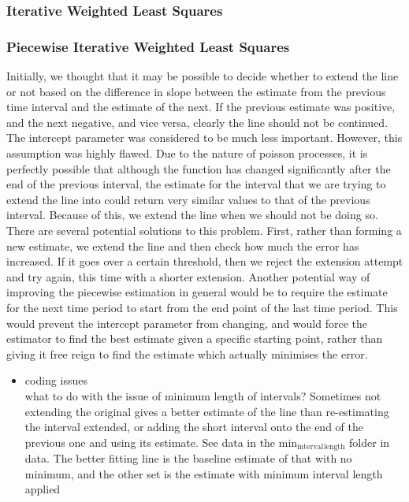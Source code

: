 \documentclass[a4paper,12pt]{article}
\begin{document}
\subsubsection{Iterative Weighted Least Squares}
\label{sec-4-1-2}
\subsubsection{Piecewise Iterative Weighted Least Squares}
\label{sec-4-1-3}

    Initially, we thought that it may be possible to decide whether to
    extend the line or not based on the difference in slope between
    the estimate from the previous time interval and the estimate of
    the next. If the previous estimate was positive, and the next
    negative, and vice versa, clearly the line should not be
    continued. The intercept parameter was considered to be much less
    important. However, this assumption was highly flawed. Due to the
    nature of poisson processes, it is perfectly possible that
    although the function has changed significantly after the end of
    the previous interval, the estimate for the interval that we are
    trying to extend the line into could return very similar values to
    that of the previous interval. Because of this, we extend the line
    when we should not be doing so. There are several potential
    solutions to this problem. First, rather than forming a new
    estimate, we extend the line and then check how much the error has
    increased. If it goes over a certain threshold, then we reject the
    extension attempt and try again, this time with a shorter
    extension. Another potential way of improving the piecewise
    estimation in general would be to require the estimate for the
    next time period to start from the end point of the last time
    period. This would prevent the intercept parameter from changing,
    and would force the estimator to find the best estimate given a
    specific starting point, rather than giving it free reign to find
    the estimate which actually minimises the error.
\begin{itemize}

\item coding issues\\
\label{sec-4-1-3-1}%
what to do with the issue of minimum length of intervals? Sometimes
not extending the original gives a better estimate of the line than
re-estimating the interval extended, or adding the short interval onto
the end of the previous one and using its estimate. See data in the
min$_{\mathrm{interval}}$$_{\mathrm{length}}$ folder in data. The better fitting line is the
baseline estimate of that with no minimum, and the other set is the
estimate with minimum interval length applied
\end{itemize} %
\end{document}
